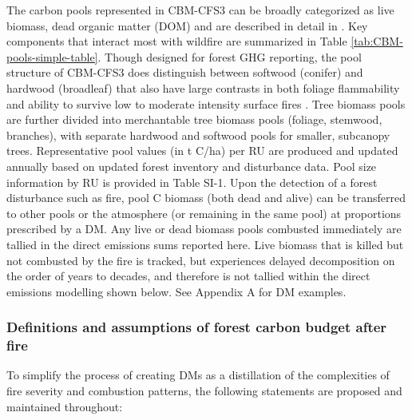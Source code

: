 \documentclass[, manuscript]{copernicus}
\begin{document}
The carbon pools represented in CBM-CFS3 can be broadly categorized as
live biomass, dead organic matter (DOM) and are described in detail in
\citet{kurzCBMCFS3ModelCarbondynamics2009}. Key components that interact
most with wildfire are summarized in Table
\ref{tab:CBM-pools-simple-table}. Though designed for forest GHG
reporting, the pool structure of CBM-CFS3 does distinguish between
softwood (conifer) and hardwood (broadleaf) that also have large
contrasts in both foliage flammability
\citep{alexanderSurfaceFireSpread2010} and ability to survive low to
moderate intensity surface fires \citep{heonResistanceBorealForest2014}.
Tree biomass pools are further divided into merchantable tree biomass
pools (foliage, stemwood, branches), with separate hardwood and softwood
pools for smaller, subcanopy trees. Representative pool values (in t
C/ha) per RU are produced and updated annually based on updated forest
inventory and disturbance data. Pool size information by RU is provided
in Table SI-1. Upon the detection of a forest disturbance such as fire,
pool C biomass (both dead and alive) can be transferred to other pools
or the atmosphere (or remaining in the same pool) at proportions
prescribed by a DM. Any live or dead biomass pools combusted immediately
are tallied in the direct emissions sums reported here. Live biomass
that is killed but not combusted by the fire is tracked, but experiences
delayed decomposition on the order of years to decades, and therefore is
not tallied within the direct emissions modelling shown below. See
Appendix A for DM examples.

\subsubsection{Definitions and assumptions of forest carbon budget after
fire}

To simplify the process of creating DMs as a distillation of the
complexities of fire severity and combustion patterns, the following
statements are proposed and maintained throughout:
\end{document}
